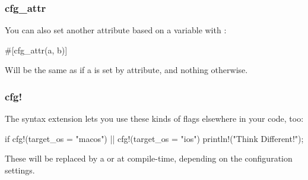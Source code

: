 \subsubsection*{cfg\_attr}

You can also set another attribute based on a  variable with :

\begin{rustc}
#[cfg_attr(a, b)]
\end{rustc}

Will be the same as \code{\#[b]} if a is set by  attribute, and nothing otherwise.

\subsubsection*{cfg!}

The  syntax extension lets you use these kinds of flags elsewhere in your code, too:

\begin{rustc}
if cfg!(target_os = "macos") || cfg!(target_os = "ios") {
    println!("Think Different!");
}
\end{rustc}

These will be replaced by a  or  at compile-time, depending on the configuration settings.
